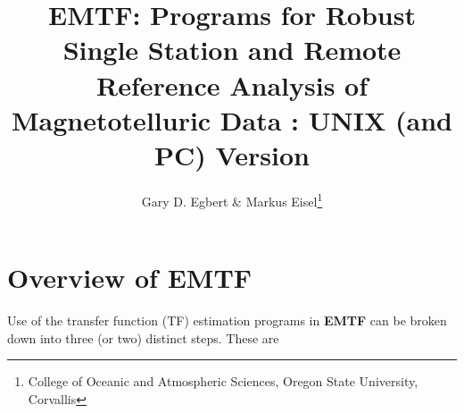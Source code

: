 \setlength{\textheight}{23cm}
\setlength{\textwidth}{16cm}
\setlength{\oddsidemargin}{0.25in}
\setlength{\topmargin}{-0.5in}
\setlength{\parskip}{.05in}
\setlength{\parindent}{0em}
\title{EMTF: Programs for Robust Single Station and Remote Reference Analysis of Magnetotelluric Data : UNIX (and PC) Version}
\author{Gary D. Egbert \& Markus Eisel\thanks{College of Oceanic and Atmospheric Sciences, Oregon State University, Corvallis}}



\maketitle

\section{Overview of EMTF}

Use of the transfer function (TF) estimation programs 
in {\bf EMTF} can be broken
down into three (or two) distinct steps.  
These are


